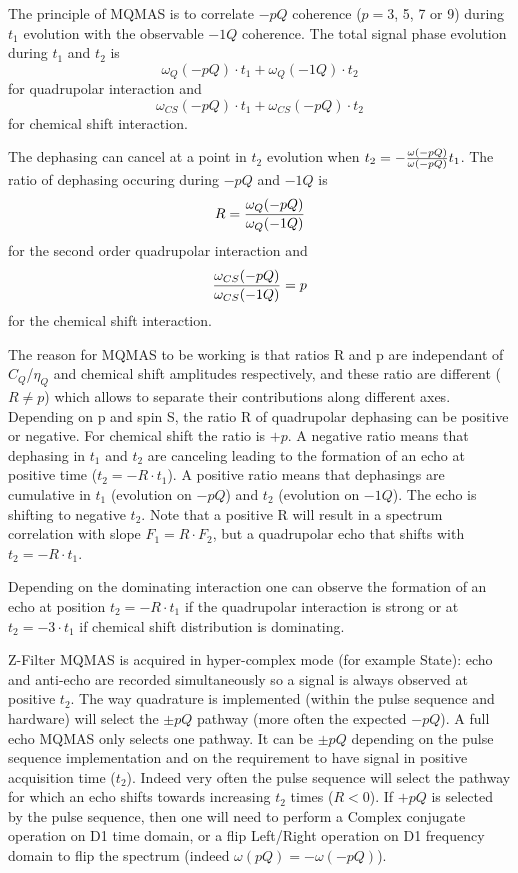 \documentclass[11pt,a4paper]{article}
\begin{document}
The principle of MQMAS is to correlate $-pQ$ coherence ($p=3$, 5, 7 or 9) during $t_1$ evolution with the observable $-1Q$ 
coherence. The total signal phase evolution during $t_1$ and $t_2$ is 
$$\omega_Q(-pQ) \cdot t_1 + \omega_Q(-1Q) \cdot t_2$$
for quadrupolar interaction and
$$\omega_{CS}(-pQ) \cdot t_1 + \omega_{CS}(-pQ) \cdot t_2$$
for chemical shift interaction.

The dephasing can cancel at a point in $t_2$ evolution when $t_2 = - {\omega(-pQ) \over \omega(-pQ)} t_1$.
The ratio of dephasing occuring during $-pQ$ and $-1Q$ is
$$R={\omega_Q(-pQ) \over \omega_Q(-1Q)}$$
for the second order quadrupolar interaction and
$${\omega_{CS}(-pQ) \over \omega_{CS}(-1Q)} = p $$
for the chemical shift interaction.

The reason for MQMAS to be working is that ratios R and p are independant of $C_Q$/$\eta_Q$ and chemical shift 
amplitudes respectively, and these ratio are different ($R \neq p$) which allows to separate their contributions along 
different axes.
Depending on p and spin S, the ratio R of quadrupolar dephasing can be positive or negative. For chemical shift the ratio is $+p$.
A negative ratio means that dephasing in $t_1$ and $t_2$ are canceling leading to the formation of an echo at positive time 
($t_2 = - R \cdot t_1$).
A positive ratio means that dephasings are cumulative in $t_1$ (evolution on $-pQ$) and $t_2$ (evolution on $-1Q$). 
The echo is shifting to negative $t_2$. Note that a positive R will result in a spectrum correlation with 
slope $F_1=R\cdot F_2$, but a quadrupolar echo that shifts with $t_2 = -R \cdot t_1$.

Depending on the dominating interaction one can observe the formation of an echo at position $t_2 = -R \cdot t_1$ if 
the quadrupolar interaction is strong or at $t_2 = -3 \cdot t_1$ if chemical shift distribution is dominating.

Z-Filter MQMAS is acquired in hyper-complex mode (for example State): echo and anti-echo are recorded simultaneously so a signal
is always observed at positive $t_2$. The way quadrature is implemented (within the pulse sequence and hardware) will select 
the $\pm pQ$ pathway (more often the expected $-pQ$).
A full echo MQMAS only selects one pathway. It can be $\pm pQ$ depending on the pulse sequence implementation and on the 
requirement to have signal in positive acquisition time ($t_2$). Indeed very often the pulse sequence will select the pathway
for which an echo shifts towards increasing $t_2$ times ($R < 0$).
If $+pQ$ is selected by the pulse sequence, then one will need to perform a Complex conjugate operation on D1 time domain, 
or a flip Left/Right operation on D1 frequency domain to flip the spectrum (indeed $\omega(pQ) = -\omega(-pQ)$).
\end{document}
